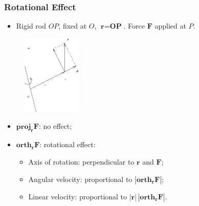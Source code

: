 \begin{frame}
 \frametitle{Rotational Effect}

 \begin{itemize}
  \item Rigid rod $OP$, fixed at $O$, $\textbf{r}=\textbf{OP}$. Force $\textbf{F}$ applied at $P$.
 \end{itemize}
%
\begin{figure}[h]
  \psfrag{}{$\alpha$}
  \includegraphics[height=1.5in]{../images/ok-torque.eps}
\end{figure}
%
\pause
\begin{itemize}
  \item $\textbf{proj}_{\bm{r}} \textbf{F}$: \pause no effect;
  \item $\textbf{orth}_{\bm{r}} \textbf{F}$: \pause rotational effect:\pause
  \begin{itemize}
    \item Axis of rotation: \pause perpendicular to $\textbf{r}$ and $\textbf{F}$;\pause
    \item Angular velocity: \pause proportional to $|\textbf{orth}_{\bm{r}} \textbf{F}|$;\pause
    \item Linear velocity: \pause proportional to $|\textbf{r}| \, |\textbf{orth}_{\bm{r}} \textbf{F}|$.
  \end{itemize}
\end{itemize}

\end{frame}

